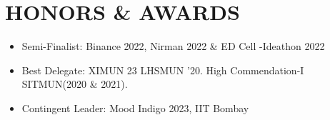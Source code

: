 \documentclass[letterpaper,11pt]{article}
\newcommand{\resumeItem}[1]{
  \item\small{
    {#1 \vspace{-2pt}}
  }
}
\newcommand{\resumeSubItem}[1]{\resumeItem{#1}\vspace{-4pt}}
\newcommand{\resumeSubHeadingListStart}{\begin{itemize}[leftmargin=0.15in, label={}]}
\newcommand{\resumeSubHeadingListEnd}{\end{itemize}}
\begin{document}
%


\section{HONORS \& AWARDS}
  \resumeSubHeadingListStart
    \resumeSubItem
      {Semi-Finalist: Binance 2022, Nirman 2022 \& ED Cell -Ideathon 2022 }
    \resumeSubItem
      {Best Delegate: XIMUN 23 LHSMUN '20. High Commendation-I SITMUN(2020 \& 2021). }
    \resumeSubItem
      {Contingent Leader: Mood Indigo 2023, IIT Bombay}
  \resumeSubHeadingListEnd

\end{document}
